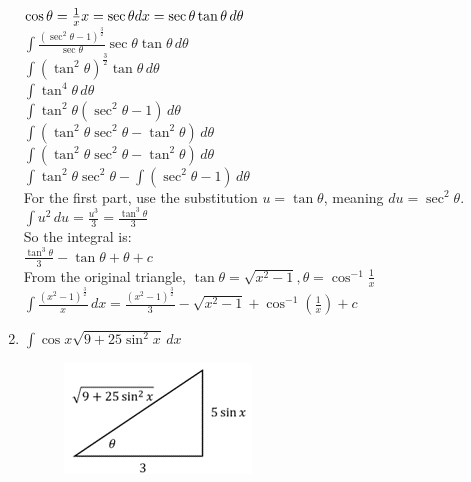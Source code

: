 \documentclass[../main.tex]{subfiles}
\begin{document}
\begin{enumerate}
    \(\cos{\theta}=\frac{1}{x}\\
    x=\sec{\theta}\\
    dx=\sec{\theta}\tan{\theta}\,d\theta\)\\

    \(\int \frac{(\sec^2{\theta}-1)^{\frac{3}{2}}}{\sec{\theta}}\sec{\theta}\tan{\theta}\,d\theta\)\\

    \(\int (\tan^2{\theta})^{\frac{3}{2}}\tan{\theta}\,d\theta\)\\

    \(\int \tan^4{\theta}\,d\theta\)\\

    \(\int \tan^2{\theta}(\sec^2{\theta}-1)\,d\theta\)\\

    \(\int (\tan^2{\theta}\sec^2{\theta}-\tan^2{\theta})\,d\theta\)\\

    \(\int (\tan^2{\theta}\sec^2{\theta}-\tan^2{\theta})\,d\theta\)\\

    \(\int \tan^2{\theta}\sec^2{\theta}-\int (\sec^2{\theta}-1)\,d\theta\)\\

    For the first part, use the substitution \(u=\tan{\theta}\), meaning \(du=\sec^2{\theta}\).\\
    \(\int u^2\,du=\frac{u^3}{3}=\frac{\tan^3{\theta}}{3}\)\\

    So the integral is:\\
    \(\frac{\tan^3{\theta}}{3}-\tan{\theta}+\theta+c\)\\

    From the original triangle, \(\tan{\theta}=\sqrt{x^2-1}, \theta=\cos^{-1}{\frac{1}{x}}\)\\

    \(\int \frac{(x^2-1)^{\frac{3}{2}}}{x}\,dx=\frac{(x^2-1)^{\frac{3}{2}}}{3}-\sqrt{x^2-1}+\cos^{-1}{(\frac{1}{x})}+c\)\\

    \item 
    \(\int \cos{x}\sqrt{9+25\sin^2{x}}\,dx\)\\
    \begin{figure}[h]
        \includegraphics{images/trigsuba11.png}
    \end{figure}


\end{enumerate}
\end{document}
